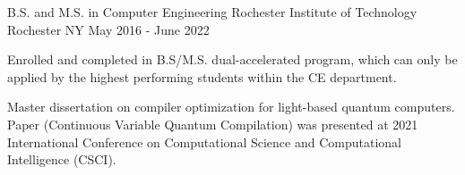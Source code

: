 

\begin{cventries}

  \cventry
    {B.S. and M.S. in Computer Engineering} %
    {Rochester Institute of Technology} %
    {Rochester NY} %
    {May 2016 - June 2022} %
    {
      \begin{cvitems} %
        \item {Enrolled and completed in B.S/M.S. dual-accelerated program, which can only be applied by the highest performing students within the CE department.}
        \item {Master dissertation on compiler optimization for light-based quantum computers. Paper (Continuous Variable Quantum Compilation) was presented at 2021 International Conference on Computational Science and Computational Intelligence (CSCI).}
      \end{cvitems}
    }

\end{cventries}
